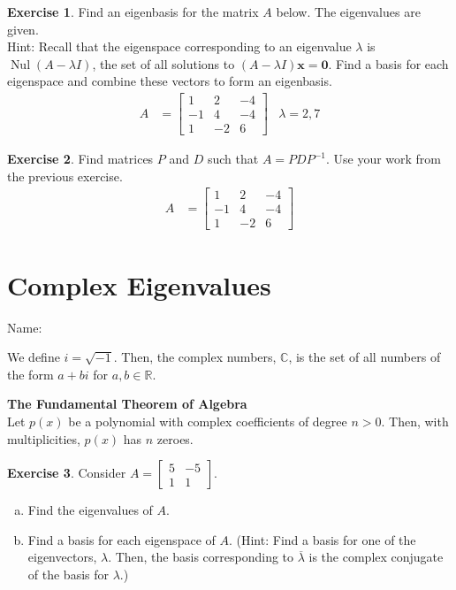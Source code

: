 \documentclass[10pt]{book}
\newcommand{\boxcolor}{gray!30}
\newenvironment{boxthm}{\begin{mdframed}[backgroundcolor=\boxcolor,nobreak=true]}{\end{mdframed}}
\newenvironment{boxdef}{\begin{mdframed}[backgroundcolor=\boxcolor,linewidth=0pt,nobreak=true]}{\end{mdframed}}
\theoremstyle{definition}
\newtheorem{exercise}{Exercise}[section]
\newcommand{\name}[1][2.5in]{\vspace{-2.3em}\hfill Name: \underline{\hspace{#1}}}
\newcommand{\vect}[1]{\ensuremath{\boldsymbol{\mathbf{#1}}}}
\DeclareMathOperator{\Nul}{Nul}
\begin{document}
\begin{exercise} %
	Find an eigenbasis for the matrix $A$ below. The eigenvalues are given. \\
	Hint: Recall that the eigenspace corresponding to an eigenvalue $\lambda$ is $\Nul(A-\lambda I)$, the set of all solutions to $(A-\lambda I)\vect{x}=\vect{0}$. Find a basis for each eigenspace and combine these vectors to form an eigenbasis.
	\begin{align*}
	A &= \begin{bmatrix}1&2&-4\\-1&4&-4\\1&-2&6\end{bmatrix} & \lambda = 2,7
	\end{align*}
\end{exercise}
\vfill


\begin{exercise} %
	Find matrices $P$ and $D$ such that $A=PDP^{-1}$. Use your work from the previous exercise.
	\begin{align*}
	A &= \begin{bmatrix}1&2&-4\\-1&4&-4\\1&-2&6\end{bmatrix}
	\end{align*}
\end{exercise}
\vspace{1.5in}


\newpage

\setcounter{section}{4}

\section{Complex Eigenvalues}
\name

\begin{boxdef}
	We define $i = \sqrt{-1}$. Then, the complex numbers, $\mathbb{C}$, is the set of all numbers of the form $a+bi$ for $a, b \in \mathbb{R}$.
\end{boxdef}

\begin{boxthm}
	\textbf{The Fundamental Theorem of Algebra} \\
	Let $p(x)$ be a polynomial with complex coefficients of degree $n>0$. Then, with multiplicities, $p(x)$ has $n$ zeroes.
\end{boxthm}

\begin{exercise} %
	Consider $A  = \begin{bmatrix}5&-5\\1&1 \end{bmatrix}.$
	\begin{enumerate}[(a)]
		\item Find the eigenvalues of $A$.
		\vfill
		\item Find a basis for each eigenspace of $A$. (Hint: Find a basis for one of the eigenvectors, $\lambda$. Then, the basis corresponding to $\overline{\lambda}$ is the complex conjugate of the basis for $\lambda$.)
		\vfill
		\vfill
	\end{enumerate}
\end{exercise}
\end{document}
